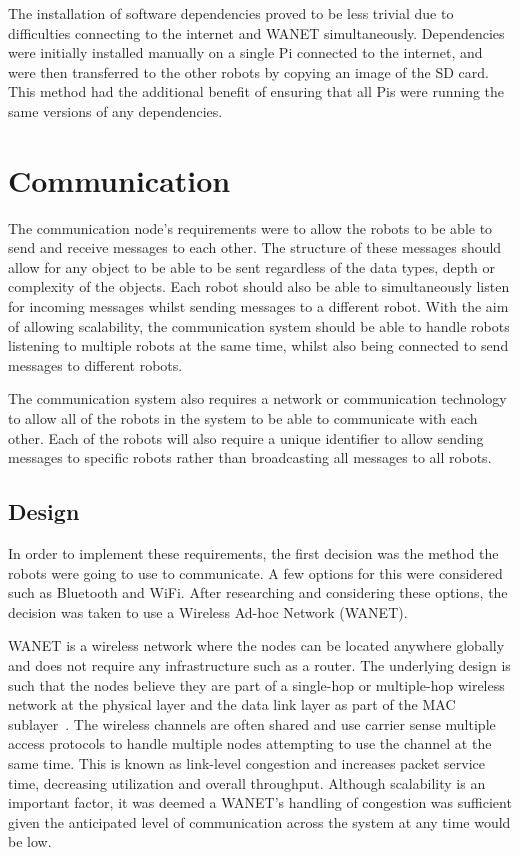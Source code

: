 The installation of software dependencies proved to be less trivial due to
difficulties connecting to the internet and WANET simultaneously.
Dependencies were initially installed manually on a single Pi connected to
the internet, and were then transferred to the other robots by copying an
image of the SD card. This method had the additional benefit of ensuring
that all Pis were running the same versions of any dependencies.

\section{Communication}\label{soft/comms}
The communication node's requirements were to allow the robots to
be able to send and receive messages to each other. The structure
of these messages should allow for any object to be able to be sent
regardless of the data types, depth or complexity of the objects.
Each robot should also be able to simultaneously listen for
incoming messages whilst sending messages to a different robot.
With the aim of allowing scalability, the communication system
should be able to handle robots listening to multiple robots at the
same time, whilst also being connected to send messages to different
robots.

The communication system also requires a network or communication
technology to allow all of the robots in the system to be able to
communicate with each other. Each of the robots will also require
a unique identifier to allow sending messages to specific robots
rather than broadcasting all messages to all robots.

\subsection{Design}\label{soft/comms/design}
In order to implement these requirements,	 the first decision was the
method the robots were going to use to communicate. A few options
for this were considered such as Bluetooth and WiFi. After
researching and considering these options, the decision was taken
to use a Wireless Ad-hoc Network (WANET).

WANET is a wireless network where the nodes can be located anywhere
globally and does not require any infrastructure such as a router. The underlying design is such that the nodes believe
they are part of a single-hop or multiple-hop wireless network at the
physical layer and the data link layer as part of the MAC sublayer~\cite{rajesh2015congestion}. The wireless channels are often shared
and use carrier sense multiple access protocols to handle multiple
nodes attempting to use the channel at the same time. This is known
as link-level congestion and increases packet service time,
decreasing utilization and overall throughput. Although scalability
is an important factor, it was deemed a WANET's handling of
congestion was sufficient given the anticipated level of
communication across the system at any time would be low.

